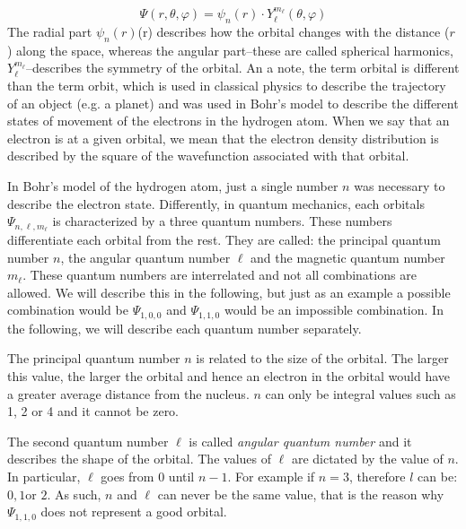 \documentclass[main.tex]{subfiles}
\begin{document}
\begin{description}
 \begin{equation*}
\Psi(r, \theta, \varphi)=\psi_{n} (r) \cdot Y_{\ell}^{m_\ell}(\theta, \varphi)
\end{equation*}
The radial part $\psi_{n} (r)$(r) describes how the orbital changes with the distance ($r$) along the space, whereas the angular part--these are called spherical harmonics, $Y_{\ell}^{m_\ell}$--describes the symmetry of the orbital. An a note, the term orbital is different than the term orbit, which is used in classical physics to describe the trajectory of an object (e.g. a planet) and was used in Bohr's model to describe the different states of movement of the electrons in the hydrogen atom. When we say that an electron is at a given orbital, we mean that the electron density distribution is described by the square of the wavefunction associated with that orbital.
\item[\docfilehook{Orbitals are described by three quantum numbers}{}] 
In Bohr's model of the hydrogen atom, just a single number $n$ was necessary to describe the electron state. Differently, in quantum mechanics, each orbitals $\Psi_{n, \ell, m_\ell}$ is characterized by a three quantum numbers. These numbers differentiate each orbital from the rest. They are called: the principal quantum number $n$, the angular quantum number $\ell$ and the magnetic quantum number $m_{\ell}$. These quantum numbers are interrelated and not all combinations are allowed. We will describe this in the following, but just as an example a possible combination would be $\Psi_{1,0, 0}$ and $\Psi_{1,1, 0}$ would be an impossible combination. In the following, we will describe each quantum number separately. 
 \item[\docfilehook{Principal quantum number, $n$}{}]
The principal quantum number $n$ is related to the size of the orbital. The larger this value, the larger the orbital and hence an electron in the orbital would have a greater average distance from the nucleus. $n$ can only be integral values such as 1, 2 or 4 and it cannot be zero. 
 \item[\docfilehook{Angular quantum number, $\ell$}{}]
The second quantum number $\ell$ is called \emph{angular quantum number} and it describes the shape of the orbital. The values of $\ell$ are dictated by the value of $n$. In particular, $\ell$ goes from $0$ until $n-1$. For example if $n=3$, therefore $l$ can be: $0, 1 \text{or }2$. As such, $n$ and $\ell$ can never be the same value, that is the reason why $\Psi_{1,1, 0}$ does not represent a good orbital.
 

\end{description}
\end{document}

